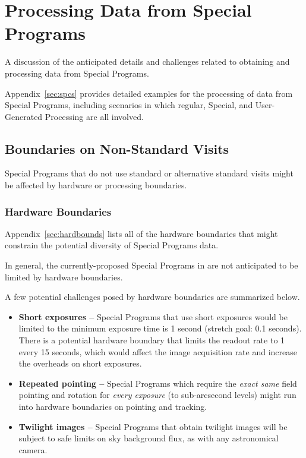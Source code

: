\section{Processing Data from Special Programs}\label{sec:proc}

A discussion of the anticipated details and challenges related to 
obtaining and processing data from Special Programs.

Appendix~\ref{sec:spcs} provides detailed examples for the processing
of data from Special Programs, including scenarios in which regular,
Special, and User-Generated Processing are all involved.

\subsection{Boundaries on Non-Standard Visits} \label{ssec:proc_bounds}

Special Programs that do not use standard or alternative standard visits
might be affected by hardware or processing boundaries.

\subsubsection{Hardware Boundaries}\label{ssec:proc_bounds_hardware}

Appendix~\ref{sec:hardbounds} lists all of the hardware boundaries that 
might constrain the potential diversity of Special Programs data.

In general, the currently-proposed Special Programs in 
are not anticipated to be limited by hardware boundaries.

A few potential challenges posed by hardware
boundaries are summarized below.

\begin{itemize}

\item \textbf{Short exposures --}
Special Programs that use short exposures would be limited to the
minimum exposure time is 1 second (stretch goal: 0.1 seconds).
There is a potential hardware boundary that limits the readout rate to 1 
every 15 seconds, which would affect the image acquisition rate and 
increase the overheads on short exposures.

\item \textbf{Repeated pointing --}
Special Programs which require the \emph{exact same} field pointing and 
rotation for \emph{every exposure} (to sub-arcsecond levels) might run 
into hardware boundaries on pointing and tracking.

\item \textbf{Twilight images --}
Special Programs that obtain twilight images will be subject to safe
limits on sky background flux, as with any astronomical camera.

\end{itemize}

